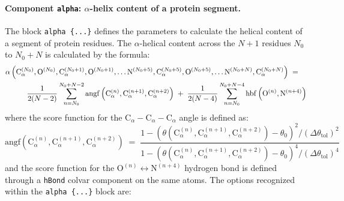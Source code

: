 \paragraph*{Component \texttt{alpha}: $\alpha$-helix content of a
  protein segment.}  The block \texttt{alpha~\{...\}} defines the
parameters to calculate the helical content of a segment of protein
residues.  The $\alpha$-helical content across the $N+1$ residues
$N_{0}$ to $N_{0}+N$ is calculated by the formula:
\begin{eqnarray}
  \label{eq:colvars_alpha}
  { 
    \alpha\left(
      \mathrm{C}_{\alpha}^{(N_{0})},
      \mathrm{O}^{(N_{0})},
      \mathrm{C}_{\alpha}^{(N_{0}+1)},
      \mathrm{O}^{(N_{0}+1)},
      \ldots
      \mathrm{N}^{(N_{0}+5)},
      \mathrm{C}_{\alpha}^{(N_{0}+5)},
      \mathrm{O}^{(N_{0}+5)},
      \ldots
      \mathrm{N}^{(N_{0}+N)},
      \mathrm{C}_{\alpha}^{(N_{0}+N)}
    \right)
  } \; = \; \; \; \; \\ \; \; \; \; {
    \nonumber
    \frac{1}{2(N-2)} 
    \sum_{n=N_{0}}^{N_{0}+N-2}
    \mathrm{angf}\left(
        \mathrm{C}_{\alpha}^{(n)},
        \mathrm{C}_{\alpha}^{(n+1)},
        \mathrm{C}_{\alpha}^{(n+2)}\right)
  } \; + \; {
    \frac{1}{2(N-4)} 
    \sum_{n=N_{0}}^{N_{0}+N-4}
    \mathrm{hbf}\left(
      \mathrm{O}^{(n)},
      \mathrm{N}^{(n+4)}\right)
  } \\
\end{eqnarray}
where the score function for the $\mathrm{C}_{\alpha} -
\mathrm{C}_{\alpha} - \mathrm{C}_{\alpha}$ angle is defined as: 
\begin{equation}
  \label{eq:colvars_alpha_Calpha}
  {
    \mathrm{angf}\left(
      \mathrm{C}_{\alpha}^{(n)},
      \mathrm{C}_{\alpha}^{(n+1)},
      \mathrm{C}_{\alpha}^{(n+2)}\right)
  } \; = \; {
    \frac{1 - \left(\theta(
        \mathrm{C}_{\alpha}^{(n)},
        \mathrm{C}_{\alpha}^{(n+1)},
        \mathrm{C}_{\alpha}^{(n+2)}) -
        \theta_{0}\right)^{2} /
      \left(\Delta\theta_{\mathrm{tol}}\right)^{2}}{
      1 - \left(\theta(
        \mathrm{C}_{\alpha}^{(n)},
        \mathrm{C}_{\alpha}^{(n+1)},
        \mathrm{C}_{\alpha}^{(n+2)}) -
        \theta_{0}\right)^{4} /
      \left(\Delta\theta_{\mathrm{tol}}\right)^{4}}
  }
\end{equation}
and the score function for the $\mathrm{O}^{(n)} \leftrightarrow
\mathrm{N}^{(n+4)}$ hydrogen bond is defined through a \texttt{hBond}
colvar component on the same atoms.  The options recognized within the
\texttt{alpha~\{...\}} block are:
